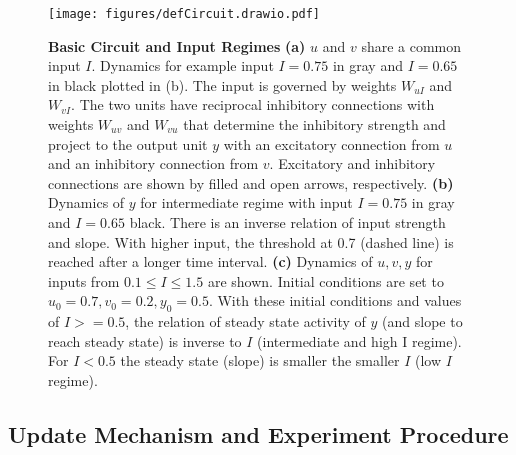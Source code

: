 \documentclass[9pt]{article}
\begin{document}
\begin{figure}[ht]
	\centering
	\texttt{[image: figures/defCircuit.drawio.pdf]}
	\caption{\textbf{Basic Circuit and Input Regimes} 
	\textbf{(a)} $u$ and $v$ share a common input $I$. Dynamics for example input $I=0.75$ in gray and $I=0.65$ in black plotted in (b). The input is governed by weights $W_{uI}$ and $W_{vI}$. The two units have reciprocal inhibitory connections with weights $W_{uv}$ and $W_{vu}$ that determine the inhibitory strength and project to the output unit $y$ with an excitatory connection from $u$ and an inhibitory connection from $v$. Excitatory and inhibitory connections are shown by filled and open arrows, respectively. 
	\textbf{(b)} Dynamics of $y$ for intermediate regime with input $I=0.75$ in gray and $I=0.65$ black. There is an inverse relation of input strength and slope. With higher input, the threshold at 0.7 (dashed line) is reached after a longer time interval. 
	\textbf{(c)} Dynamics of $u, v, y$ for inputs from $0.1\leq I \leq 1.5$ are shown. Initial conditions are set to $u_0=0.7 , v_0=0.2 , y_0=0.5$. With these initial conditions and values of $I>=0.5$, the relation of steady state activity of $y$ (and slope to reach steady state) is inverse to $I$ (intermediate and high I regime). For $I<0.5$ the steady state (slope) is smaller the smaller $I$ (low $I$ regime).}
\label{fig:circuit}
\end{figure}


\subsection{Update Mechanism and Experiment Procedure}
\end{document}
